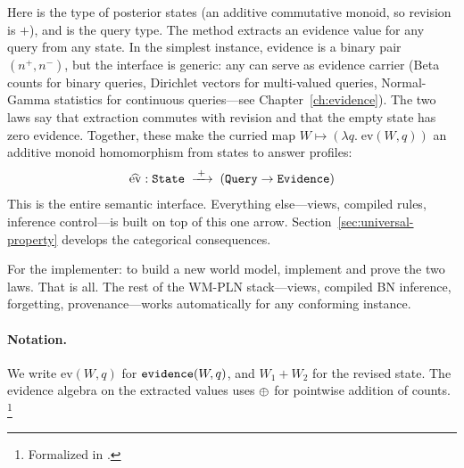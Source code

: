 \documentclass[11pt,openany]{report}
\begin{document}
Here  is the type of posterior states (an additive
commutative monoid, so revision is $+$), and  is the
query type.  The method  extracts an evidence value
for any query from any state.  In the simplest instance, evidence is a
binary pair $(n^+, n^-)$, but the interface is generic: any
 can serve as evidence carrier (Beta counts for
binary queries, Dirichlet vectors for multi-valued queries, Normal-Gamma
statistics for continuous queries---see Chapter~\ref{ch:evidence}).
The two laws say that extraction commutes with revision and that the
empty state has zero evidence.  Together, these make the curried map
$W \mapsto (\lambda q.\; \mathrm{ev}(W, q))$ an additive monoid
homomorphism from states to answer profiles:
\[
  \widehat{\mathrm{ev}} : \texttt{State} \;\xrightarrow{\;+\;}\;
  (\texttt{Query} \to \mathtt{Evidence})
\]
This is the entire semantic interface.  Everything else---views,
compiled rules, inference control---is built on top of this one arrow.
Section~\ref{sec:universal-property} develops the categorical
consequences.

For the implementer: to build a new world model, implement 
and prove the two laws.  That is all.  The rest of the WM-PLN stack---views,
compiled BN inference, forgetting, provenance---works automatically for any
conforming instance.

\paragraph{Notation.}
We write $\mathrm{ev}(W, q)$ for $\texttt{evidence}(W, q)$, and $W_1 + W_2$
for the revised state.  The evidence algebra on the extracted values uses
$\oplus$ for pointwise addition of counts.%
\footnote{Formalized in .}
\end{document}
